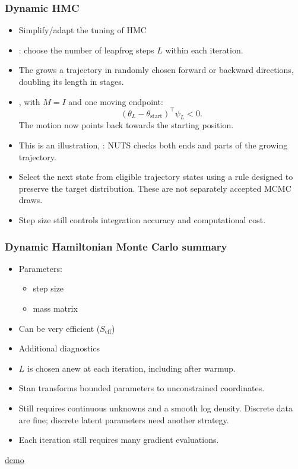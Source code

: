 \documentclass[10pt]{beamer}
\begin{document}
\begin{frame}
\frametitle{Dynamic HMC}

  \begin{itemize}
  \item {} Simplify/adapt the tuning of HMC
  \item {}: choose the number of leapfrog steps $L$
    within each iteration.
  \item The  grows a trajectory in randomly
    chosen forward or backward directions, doubling its length in stages.
  \pause
  \item {}, with $M=I$ and one moving endpoint:
  \[
  (\theta_L-\theta_{\mathrm{start}})^\top\psi_L<0.
  \]
  The motion now points back towards the starting position.
  \item This is an illustration, :
    NUTS checks both ends and parts of the growing trajectory.
  \pause
  \item Select the next state from eligible trajectory states using a
    rule designed to preserve the target distribution.
    These are not separately accepted MCMC draws.
  \item Step size still controls integration accuracy and computational cost.
\end{itemize}

\end{frame}

\begin{frame}
\frametitle{Dynamic Hamiltonian Monte Carlo summary}

\begin{itemize}
\item Parameters:
\begin{itemize}
\item[$\epsilon$] step size \pause
\item[$M$] mass matrix\pause
\end{itemize}
\item[+] Can be very efficient ($S_{\mathrm{eff}}$)
\item[+] Additional diagnostics
\pause
\item $L$ is chosen anew at each iteration, including after warmup.
\item Stan transforms bounded parameters to unconstrained coordinates.
\item Still requires continuous unknowns and a smooth log density.
  Discrete data are fine; discrete latent parameters need another strategy.
\item[-] Each iteration still requires many gradient evaluations.
\pause
\end{itemize}

\centering
\href{https://chi-feng.github.io/mcmc-demo/app.html?algorithm=EfficientNUTS&target=standard}{demo}

\end{frame}
\end{document}

